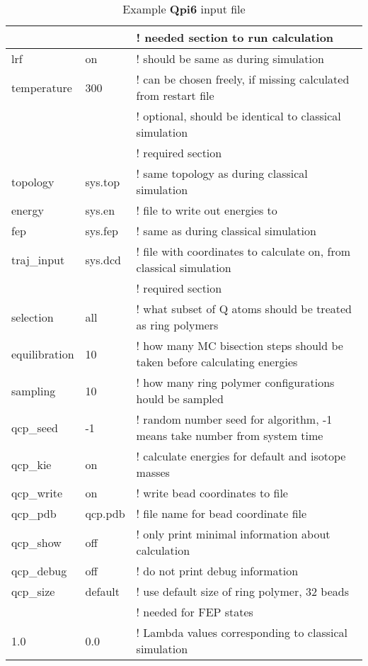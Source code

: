 \documentclass[a4paper,11pt]{article}
\begin{document}
\begin{table}
	\centering
\caption{Example \textbf{Qpi6} input file}
\begin{tabularx}{\textwidth}{|l l |X|}
\hline
\hline        [general] & & ! needed section to run calculation \\
\hline        lrf & on & ! should be same as during simulation \\
\hline        temperature & 300 & ! can be chosen freely, if missing calculated from restart file \\
\hline        [cut-offs] & & ! optional, should be identical to classical simulation \\
\hline        [files] & & ! required section \\
\hline        topology & sys.top & ! same topology as during classical simulation \\
\hline        energy & sys.en & ! file to write out energies to \\
\hline        fep & sys.fep & ! same as during classical simulation\\
\hline        traj{\_}input & sys.dcd & ! file with coordinates to calculate on, from classical simulation \\
\hline        [QCP] & & ! required section \\
\hline        selection & all & ! what subset of Q atoms should be treated as ring polymers \\
\hline        equilibration & 10 & ! how many MC bisection steps should be taken before calculating energies \\
\hline        sampling & 10 & ! how many ring polymer configurations hould be sampled \\
\hline        qcp{\_}seed & -1 & ! random number seed for algorithm, -1 means take number from system time\\
\hline        qcp{\_}kie & on & ! calculate energies for default and isotope masses \\
\hline        qcp{\_}write & on & ! write bead coordinates to file \\
\hline        qcp{\_}pdb & qcp.pdb & ! file name for bead coordinate file \\
\hline        qcp{\_}show & off & ! only print minimal information about calculation \\
\hline        qcp{\_}debug & off & ! do not print debug information \\
\hline        qcp{\_}size & default & ! use default size of ring polymer, 32 beads \\
\hline        [lambdas] & & ! needed for FEP states \\
\hline        1.0 & 0.0 & ! Lambda values corresponding to classical simulation \\
	\hline
\end{tabularx}
\end{table}
\end{document}
